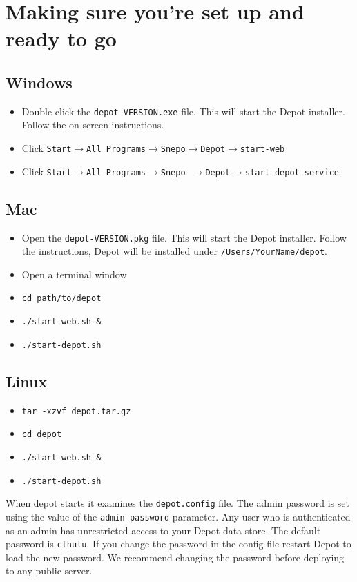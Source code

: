 \documentclass{report}
\begin{document}
\section{Making sure you're set up and ready to go}

\subsection{Windows}
\begin{itemize}
\item Double click the \texttt{depot-VERSION.exe} file. This will start the
  Depot installer. Follow the on screen instructions.
\item Click \texttt{Start$\rightarrow$All Programs$\rightarrow$Snepo$\rightarrow$Depot$\rightarrow$start-web}
\item Click \texttt{Start$\rightarrow$All Programs$\rightarrow$Snepo
$\rightarrow$Depot$\rightarrow$start-depot-service}
\end{itemize}

\subsection {Mac}
\begin{itemize}
\item Open the \texttt{depot-VERSION.pkg} file. This will start the
  Depot installer. Follow the instructions, Depot will be installed
  under \texttt{/Users/YourName/depot}.
\item Open a terminal window
\item \texttt{cd path/to/depot}
\item \texttt{./start-web.sh \&}
\item \texttt{./start-depot.sh}
\end{itemize}

\subsection{Linux}
\begin{itemize}
\item \texttt{tar -xzvf depot.tar.gz}
\item \texttt{cd depot}
\item \texttt{./start-web.sh \&}
\item \texttt{./start-depot.sh}
\end{itemize}

When depot starts it examines the \texttt{depot.config}
file. The admin password is set using the value of the
\texttt{admin-password} parameter. Any user who is authenticated 
as an admin has unrestricted access to your Depot data store.
The default password is \texttt{cthulu}. If you change the password
in the config file restart Depot to load the new password.
We recommend changing the password before deploying to any public server.
\end{document}
